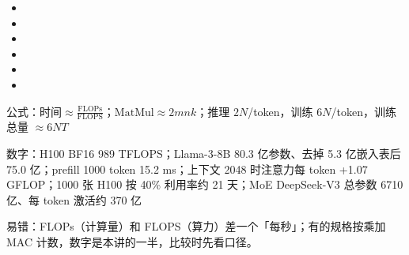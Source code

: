 \documentclass[UTF8,10.5pt,openany]{ctexbook}
\newcommand{\meta}[2]{\vspace{1pt}\begingroup\sloppy\raggedright{\sffamily\footnotesize\color{grayt}#1：#2}\par\endgroup}
\begin{document}
\begin{itemize}[leftmargin=1.35em,itemsep=2.2pt,topsep=1pt,parsep=0pt]
\item \begingroup{}\endgroup
\item \begingroup{}\endgroup
\item \begingroup{}\endgroup
\item \begingroup{}\endgroup
\item \begingroup{}\endgroup
\item \begingroup{}\endgroup
\end{itemize}
\meta{公式}{$\text{时间}\approx\frac{\text{FLOPs}}{\text{FLOPS}}$；$\text{MatMul}\approx 2mnk$；推理 $2N$/token，训练 $6N$/token，训练总量 $\approx 6NT$}
\meta{数字}{H100 BF16 989 TFLOPS；Llama-3-8B 80.3 亿参数、去掉 5.3 亿嵌入表后 75.0 亿；prefill 1000 token 15.2 ms；上下文 2048 时注意力每 token +1.07 GFLOP；1000 张 H100 按 40\% 利用率约 21 天；MoE DeepSeek-V3 总参数 6710 亿、每 token 激活约 370 亿}
\meta{易错}{FLOPs（计算量）和 FLOPS（算力）差一个「每秒」；有的规格按乘加 MAC 计数，数字是本讲的一半，比较时先看口径。}
\end{document}
